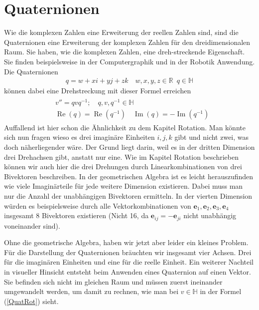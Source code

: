 %
%
%
\section{Quaternionen}

Wie die komplexen Zahlen eine Erweiterung der reellen Zahlen sind, sind die Quaternionen eine Erweiterung der komplexen Zahlen für den dreidimensionalen Raum. Sie haben, wie die komplexen Zahlen, eine dreh-streckende Eigenschaft.
Sie finden beispielsweise in der Computergraphik und in der Robotik Anwendung.
Die Quaternionen
\begin{align}
	q = w + xi + yj + zk \quad w,x,y,z \in \mathbb{R}\enspace q \in \mathbb{H}
\end{align}
können dabei eine Drehstreckung mit dieser Formel erreichen
\begin{align} \label{QuatRot}
	\begin{split} 
		&v'' = qvq^{-1};\quad q,v,q^{-1} \in \mathbb{H}\\
		&\operatorname{Re}(q) = \operatorname{Re}(q^{-1})\quad \operatorname{Im}(q) = -\operatorname{Im}(q^{-1})
	\end{split}
\end{align}
Auffallend ist hier schon die Ähnlichkeit zu dem Kapitel Rotation. Man könnte sich nun fragen wieso es drei imaginäre Einheiten $i,j,k$ gibt und nicht zwei, was doch näherliegender wäre. Der Grund liegt darin, weil es in der dritten Dimension drei Drehachsen gibt, anstatt nur eine. Wie im Kapitel Rotation beschrieben können wir auch hier die drei Drehungen durch Linearkombinationen von drei Bivektoren beschreiben. In der geometrischen Algebra ist es leicht herauszufinden wie viele Imaginärteile für jede weitere Dimension existieren. Dabei muss man nur die Anzahl der unabhängigen Bivektoren ermitteln. In der vierten Dimension würden es beispielsweise durch alle Vektorkombinationen von $\mathbf{e}_1, \mathbf{e}_2,\mathbf{e}_3, \mathbf{e}_4$ insgesamt 8 Bivektoren existieren (Nicht 16, da $\mathbf{e}_{ij} = -\mathbf{e}_{ji}$ nicht unabhängig voneinander sind).

Ohne die geometrische Algebra, haben wir jetzt aber leider ein kleines Problem. Für die Darstellung der Quaternionen bräuchten wir insgesamt vier Achsen. Drei für die imaginären Einheiten und eine für die reelle Einheit. Ein weiterer Nachteil in visueller Hinsicht entsteht beim Anwenden eines Quaternion auf einen Vektor. Sie befinden sich nicht im gleichen Raum und müssen zuerst ineinander umgewandelt werden, um damit zu rechnen, wie man bei $v \in \mathbb{H}$ in der Formel (\ref{QuatRot}) sieht.


